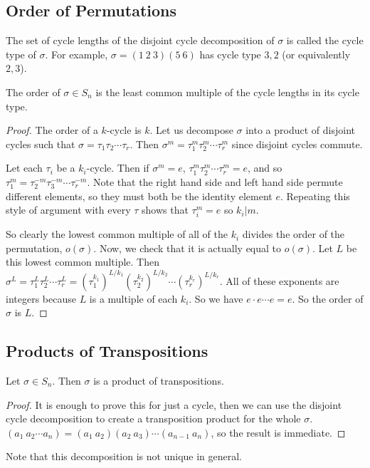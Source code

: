 \subsection{Order of Permutations}
The set of cycle lengths of the disjoint cycle decomposition of \(\sigma\) is called the cycle type of \(\sigma\).
For example, \(\sigma = (1\ 2\ 3)(5\ 6)\) has cycle type \(3, 2\) (or equivalently \(2, 3\)).

\begin{theorem}
	The order of \(\sigma \in S_n\) is the least common multiple of the cycle lengths in its cycle type.
\end{theorem}
\begin{proof}
	The order of a \(k\)-cycle is \(k\).
	Let us decompose \(\sigma\) into a product of disjoint cycles such that \(\sigma = \tau_1 \tau_2 \cdots \tau_r\).
	Then \(\sigma^m = \tau_1^m \tau_2^m \cdots \tau_r^m\) since disjoint cycles commute.

	Let each \(\tau_i\) be a \(k_i\)-cycle.
	Then if \(\sigma^m = e\), \(\tau_1^m \tau_2^m \cdots \tau_r^m = e\), and so \(\tau_1^m = \tau_2^{-m} \tau_3^{-m} \cdots \tau_r^{-m}\).
	Note that the right hand side and left hand side permute different elements, so they must both be the identity element \(e\).
	Repeating this style of argument with every \(\tau\) shows that \(\tau_i^m = e\) so \(k_i | m\).

	So clearly the lowest common multiple of all of the \(k_i\) divides the order of the permutation, \(o(\sigma)\).
	Now, we check that it is actually equal to \(o(\sigma)\).
	Let \(L\) be this lowest common multiple.
	Then \(\sigma^L = \tau_1^L \tau_2^L \cdots \tau_r^L = (\tau_1^{k_1})^{L/k_1} (\tau_2^{k_2})^{L/k_2} \cdots (\tau_r^{k_r})^{L/k_r}\).
	All of these exponents are integers because \(L\) is a multiple of each \(k_i\).
	So we have \(e \cdot e \cdots e = e\).
	So the order of \(\sigma\) is \(L\).
\end{proof}

\subsection{Products of Transpositions}
\begin{proposition}
	Let \(\sigma \in S_n\).
	Then \(\sigma\) is a product of transpositions.
\end{proposition}
\begin{proof}
	It is enough to prove this for just a cycle, then we can use the disjoint cycle decomposition to create a transposition product for the whole \(\sigma\).
	\((a_1\ a_2\cdots a_n) = (a_1\ a_2)(a_2\ a_3)\cdots(a_{n-1}\ a_n)\), so the result is immediate.
\end{proof}
\noindent Note that this decomposition is not unique in general.

